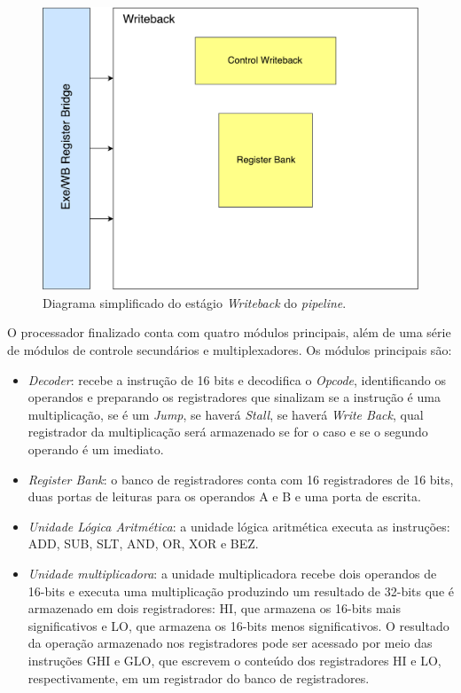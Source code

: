 \documentclass[11pt,a4paper,titlepage]{article}
\begin{document}
\begin{figure}[!h]
\centering
\includegraphics[scale=0.4]{images/writebackpipe.pdf}
\caption{Diagrama simplificado do estágio \textit{Writeback} do \textit{pipeline}.}
\label{fig:writebackpipe}
\end{figure}

O processador finalizado conta com quatro módulos principais, além de uma série de módulos
de controle secundários e multiplexadores. Os módulos principais são:

\begin{itemize}

\item \textit{Decoder}: recebe a instrução de 16 bits e decodifica o \textit{Opcode},
identificando os operandos e preparando os registradores que sinalizam se a instrução é uma 
multiplicação, se é um \textit{Jump}, se haverá \textit{Stall}, se haverá \textit{Write Back},
qual registrador da multiplicação será armazenado se for o caso e se o segundo operando é
um imediato.

\item \textit{Register Bank}: o banco de registradores conta com 16 registradores de 16 bits,
duas portas de leituras para os operandos A e B e uma porta de escrita.

\item \textit{Unidade Lógica Aritmética}: a unidade lógica aritmética executa as instruções: 
ADD, SUB, SLT, AND, OR, XOR e BEZ.

\item \textit{Unidade multiplicadora}: a unidade multiplicadora recebe dois operandos de 16-bits
e executa uma multiplicação produzindo um resultado de 32-bits que é armazenado em dois registradores:
HI, que armazena os 16-bits mais significativos e LO, que armazena os 16-bits menos significativos.
O resultado da operação armazenado nos registradores pode ser acessado por meio das instruções 
GHI e GLO, que escrevem o conteúdo dos registradores HI e LO, respectivamente, em um registrador
do banco de registradores.

\end{itemize}
\end{document}
